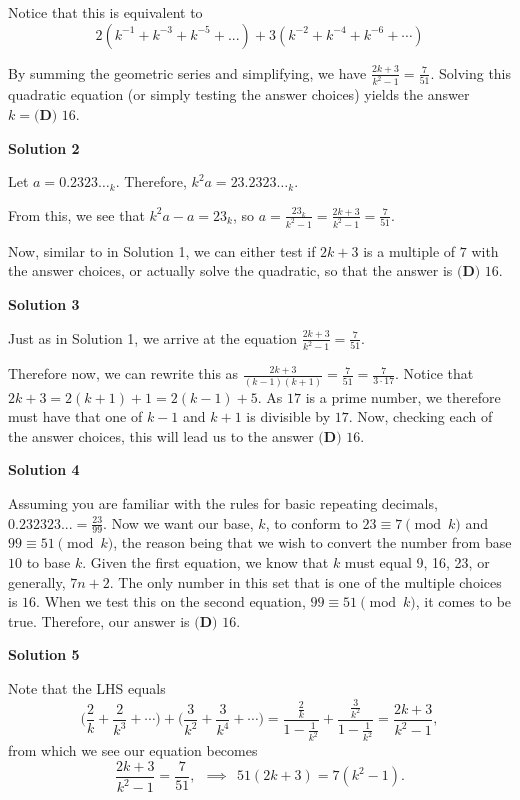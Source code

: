 \begin{enumerate}
 Notice that this is equivalent to 
 \[2( k^{-1} + k^{-3} + k^{-5} + ... ) + 3 (k^{-2} + k^{-4} + k^{-6} + \cdots )\]

 By summing the geometric series and simplifying, we have $\frac{2k+3}{k^2-1} = \frac{7}{51}$. Solving this quadratic equation (or simply testing the answer choices) yields the answer $k = \boxed{\textbf{(D) }16}$.

 



\textbf{Solution 2}

Let $a = 0.2323\dots_k$. Therefore, $k^2a=23.2323\dots_k$.

 From this, we see that $k^2a-a=23_k$, so $a = \frac{23_k}{k^2-1} = \frac{2k+3}{k^2-1} = \frac{7}{51}$.

 Now, similar to in Solution 1, we can either test if $2k+3$ is a multiple of $7$ with the answer choices, or actually solve the quadratic, so that the answer is $\boxed{\textbf{(D) }16}$.

 



\textbf{Solution 3}

Just as in Solution 1, we arrive at the equation $\frac{2k+3}{k^2-1}=\frac{7}{51}$.

 Therefore now, we can rewrite this as $\frac{2k+3}{(k-1)(k+1)}=\frac{7}{51}=\frac{7}{3\cdot 17}$. Notice that $2k+3=2(k+1)+1=2(k-1)+5$. As $17$ is a prime number, we therefore must have that one of $k-1$ and $k+1$ is divisible by $17$. Now, checking each of the answer choices, this will lead us to the answer $\boxed{\textbf{(D) }16}$.

 



\textbf{Solution 4}

Assuming you are familiar with the rules for basic repeating decimals, $0.232323... = \frac{23}{99}$. Now we want our base, $k$, to conform to $23\equiv7\pmod k$ and $99\equiv51\pmod k$, the reason being that we wish to convert the number from base $10$ to base $k$. Given the first equation, we know that $k$ must equal 9, 16, 23, or generally, $7n+2$. The only number in this set that is one of the multiple choices is $16$. When we test this on the second equation, $99\equiv51\pmod k$, it comes to be true. Therefore, our answer is $\boxed{\textbf{(D) }16}$.

 



\textbf{Solution 5}

Note that the LHS equals 
 \[\bigg(\frac{2}{k} + \frac{2}{k^3} + \cdots \bigg) + \bigg(\frac{3}{k^2} + \frac{3}{k^4} + \cdots \bigg) = \frac{\frac{2}{k}}{1 - \frac{1}{k^2}} + \frac{\frac{3}{k^2}}{1 - \frac{1}{k^2}} = \frac{2k+3}{k^2-1},\] from which we see our equation becomes 
 \[\frac{2k+3}{k^2-1} = \frac{7}{51}, \ \ \implies \ \ 51(2k+3) = 7(k^2-1).\] 


\end{enumerate}
